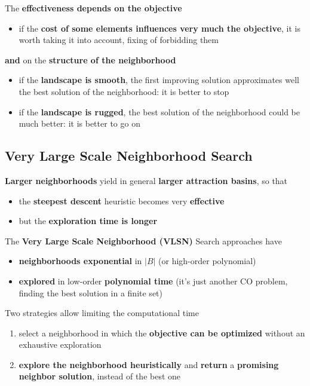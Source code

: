 \documentclass[11pt]{article}
\begin{document}
	The \textbf{effectiveness depends on the objective}
	\begin{itemize}
		\item if the \textbf{cost of some elements influences very much the objective}, it is worth taking it into account, fixing of forbidding them
	\end{itemize}
	
	\textbf{and} on the \textbf{structure of the neighborhood}
	\begin{itemize}
		\item if the \textbf{landscape is smooth}, the first improving solution approximates well the best solution of the neighborhood: it is better to stop
		
		\item if the \textbf{landscape is rugged}, the best solution of the neighborhood could be much better: it is better to go on
	\end{itemize}
	
	
	\newpage
	
	\subsection{Very Large Scale Neighborhood Search}
	\textbf{Larger neighborhoods} yield in general \textbf{larger attraction basins}, so that
	\begin{itemize}
		\item the \textbf{steepest descent} heuristic becomes very \textbf{effective}
		\item but the \textbf{exploration time is longer}
	\end{itemize}
	
	The \textbf{Very Large Scale Neighborhood (VLSN)} Search approaches have
	\begin{itemize}
		\item \textbf{neighborhoods exponential} in $|B|$ (or high-order polynomial)
		\item \textbf{explored} in low-order \textbf{polynomial time} (it's just another CO problem, finding the best solution in a finite set)
	\end{itemize}
	
	Two strategies allow limiting the computational time
	\begin{enumerate}
		\item select a neighborhood in which the \textbf{objective can be optimized} without an exhaustive exploration
		\item \textbf{explore the neighborhood heuristically} and \textbf{return} a \textbf{promising neighbor solution}, instead of the best one
	\end{enumerate}
	
\end{document}
